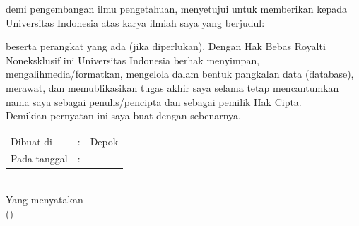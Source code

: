 \vspace*{0.6cm}
\noindent demi pengembangan ilmu pengetahuan, menyetujui untuk memberikan 
kepada Universitas Indonesia  atas karya ilmiah saya yang berjudul:
\begin{center}
	\judul
\end{center}
beserta perangkat yang ada (jika diperlukan). Dengan Hak Bebas Royalti 
Noneksklusif ini Universitas Indonesia berhak menyimpan, 
mengalihmedia/formatkan, mengelola dalam bentuk pangkalan data 
(\f{database}), merawat, dan memublikasikan tugas akhir saya selama 
tetap mencantumkan nama saya sebagai penulis/pencipta dan sebagai 
pemilik Hak Cipta. \\

\noindent Demikian pernyatan ini saya buat dengan sebenarnya.

\begin{center}
	\vspace*{0.8cm}
	\begin{tabular}{lll}
		Dibuat di&: & Depok \\
		Pada tanggal&: & \tanggalPengesahan \\
	\end{tabular}\\

	\vspace*{0.2cm}
	Yang menyatakan \\
	\vspace*{2cm}
	(\penulis)
\end{center}

\newpage

%

%
%

